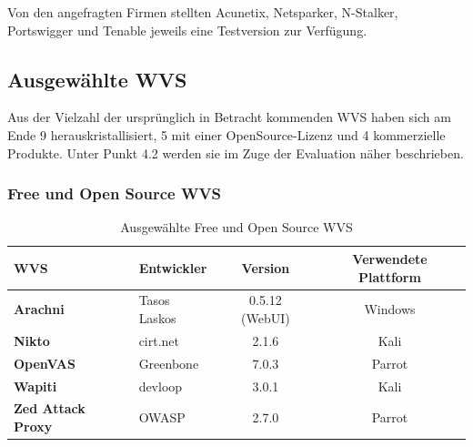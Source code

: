 \documentclass[12pt,oneside,a4paper,parskip]{scrbook}
\begin{document}
  Von den angefragten Firmen stellten Acunetix, Netsparker, N-Stalker, Portswigger und Tenable jeweils eine Testversion zur Verfügung.

  \subsection{Ausgewählte WVS}
  Aus der Vielzahl der ursprünglich in Betracht kommenden WVS haben sich am Ende 9 herauskristallisiert, 5 mit einer OpenSource-Lizenz und 4 kommerzielle Produkte. Unter Punkt 4.2 werden sie im Zuge der Evaluation näher beschrieben.
    \subsubsection{Free und Open Source WVS}
      \begin{table}[H]
        \centering
          \begin{tabular}{|l|l|c|c|}
            \hline
            \textbf{WVS}              & \textbf{Entwickler}  & \textbf{Version}     & \textbf{Verwendete Plattform}  \\
            \hline
            \textbf{Arachni}          & Tasos Laskos         & 0.5.12 (WebUI)       & Windows                       \\
            \hline
            \textbf{Nikto}            & cirt.net             & 2.1.6                & Kali                          \\
            \hline
            \textbf{OpenVAS}          & Greenbone            & 7.0.3                & Parrot                        \\
            \hline
            \textbf{Wapiti}           & devloop              & 3.0.1                & Kali                          \\
            \hline
            \textbf{Zed Attack Proxy} & OWASP                & 2.7.0                & Parrot                        \\
            \hline
          \end{tabular}
        \caption[Ausgewählte Free und Open Source WVS]{Ausgewählte Free und Open Source WVS}
      \end{table}
\end{document}

